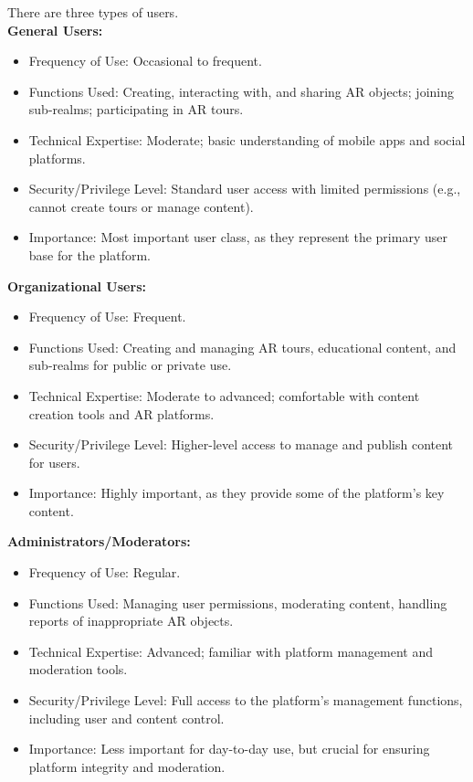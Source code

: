 \documentclass{article}
\begin{document}
There are three types of users.\\

\textbf{General Users:}
\begin{itemize}
    \item Frequency of Use: Occasional to frequent.
    \item Functions Used: Creating, interacting with, and sharing AR objects; joining sub-realms; participating in AR tours.
    \item Technical Expertise: Moderate; basic understanding of mobile apps and social platforms.
    \item Security/Privilege Level: Standard user access with limited permissions (e.g., cannot create tours or manage content).
    \item Importance: Most important user class, as they represent the primary user base for the platform.
\end{itemize}

\textbf{Organizational Users:}
\begin{itemize}
    \item Frequency of Use: Frequent.
    \item Functions Used: Creating and managing AR tours, educational content, and sub-realms for public or private use.
    \item Technical Expertise: Moderate to advanced; comfortable with content creation tools and AR platforms.
    \item Security/Privilege Level: Higher-level access to manage and publish content for users.
    \item Importance: Highly important, as they provide some of the platform’s key content.
\end{itemize}

\textbf{Administrators/Moderators:}
\begin{itemize}
    \item Frequency of Use: Regular.
    \item Functions Used: Managing user permissions, moderating content, handling reports of inappropriate AR objects.
    \item Technical Expertise: Advanced; familiar with platform management and moderation tools.
    \item Security/Privilege Level: Full access to the platform's management functions, including user and content control.
    \item Importance: Less important for day-to-day use, but crucial for ensuring platform integrity and moderation.
\end{itemize}
\end{document}
